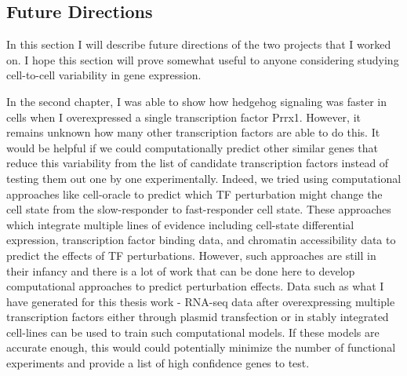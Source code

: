 \subsection{Future Directions}

In this section I will describe future directions of the two projects that I worked on. I hope this section will prove somewhat useful to anyone considering studying cell-to-cell variability in gene expression. 

In the second chapter, I was able to show how hedgehog signaling was faster in cells when I overexpressed a single transcription factor Prrx1. However, it remains unknown how many other transcription factors are able to do this. It would be helpful if we could computationally predict other similar genes that reduce this variability from the list of candidate transcription factors instead of testing them out one by one experimentally. Indeed, we tried using computational approaches like cell-oracle \cite{kamimoto2020} to predict which TF perturbation might change the cell state from the slow-responder to fast-responder cell state. These approaches which integrate multiple lines of evidence including cell-state differential expression, transcription factor binding data, and chromatin accessibility data to predict the effects of TF perturbations. However, such approaches are still in their infancy and there is a lot of work that can be done here to develop computational approaches to predict perturbation effects. Data such as what I have generated for this thesis work - RNA-seq data after overexpressing multiple transcription factors either through plasmid transfection or in stably integrated cell-lines can be used to train such computational models. If these models are accurate enough, this would could potentially minimize the number of functional experiments and provide a list of high confidence genes to test.

